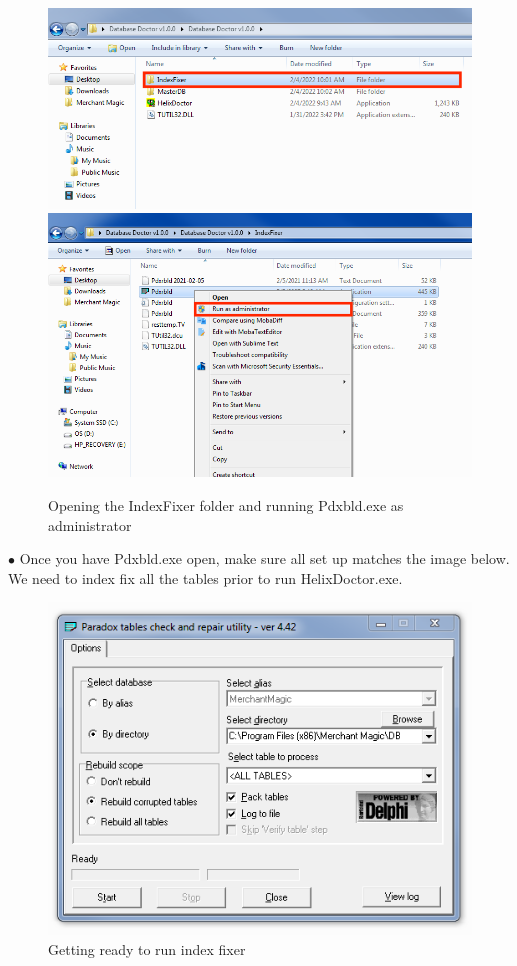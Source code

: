 \documentclass[a4paper, 11pt]{article}
\begin{document}
\begin{figure}[h]
    \centering
    \includegraphics[width=\textwidth]{capture 18}
     \includegraphics[width=\textwidth]{capture 19}
    \caption{Opening the IndexFixer folder and running Pdxbld.exe as administrator}
\end{figure}

\pagebreak

\vspace*{\fill}
$\bullet$ Once you have Pdxbld.exe open, make sure all set up matches the image below. We need to index fix all the tables prior to run HelixDoctor.exe.

\begin{figure}[h]
    \centering
     \includegraphics[width=\textwidth]{capture 20}
    \caption{Getting ready to run index fixer}
\end{figure}
\vspace*{\fill}
\end{document}
